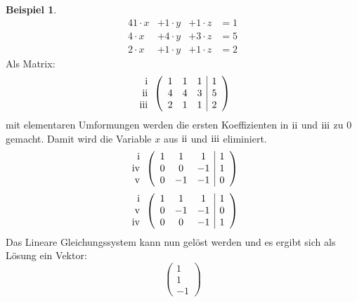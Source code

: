 \documentclass[a4paper,12pt]{article}
\newcommand{\RN}[1]{%
	\textup{\uppercase\expandafter{\romannumeral#1}}%
}
\theoremstyle{definition}
\newtheorem*{example}{Beispiel}
\begin{document}
	\begin{example}
		\begin{alignat*}{4}
			1 \cdot x &+ 1 \cdot y &+ 1 \cdot z &= 1\\
			4 \cdot x &+ 4 \cdot y &+ 3 \cdot z &= 5\\
			2 \cdot x &+ 1 \cdot y &+ 1 \cdot z &= 2
		\end{alignat*}
		Als Matrix:
		\[
			\begin{array}{r}
				\RN{1}\\
				\RN{2}\\
				\RN{3}
			\end{array}
			\left(
			\begin{array}{ccc|c}
				1 & 1 & 1 & 1\\
				4 & 4 & 3 & 5\\
				2 & 1 & 1 & 2
			\end{array}
			\right)
		\]
		mit elementaren Umformungen werden die ersten Koeffizienten in $\RN{2}$ und $\RN{3}$ zu $0$ gemacht. Damit wird die Variable $x$ aus $\RN{2}$ und $\RN{3}$ eliminiert.
		\[
			\begin{array}{r}
				\RN{1}\\
				\RN{4}\\
				\RN{5}
			\end{array}
			\left(
			\begin{array}{ccc|c}
				1 & 1 & 1 & 1\\
				0 & 0 & -1 & 1\\
				0 & -1 & -1 & 0
			\end{array}
			\right)
		\]
		\[
			\begin{array}{r}
				\RN{1}\\
				\RN{5}\\
				\RN{4}
			\end{array}
			\left(
			\begin{array}{ccc|c}
				1 & 1 & 1 & 1\\
				0 & -1 & -1 & 0\\
				0 & 0 & -1 & 1
			\end{array}
			\right)
		\]
		Das Lineare Gleichungssystem kann nun gelöst werden und es ergibt sich als Lösung ein Vektor: \[
			\left(\begin{array}{c}
				1\\1\\-1
			\end{array}\right)
		\]
	\end{example}
\end{document}
